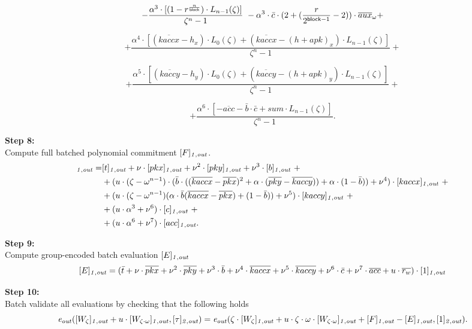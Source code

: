 $$-\frac{\alpha^3 \cdot[(1 - r^{\frac{n}{\mathsf{block}}}) \cdot L_{n-1}(\zeta)]}{\zeta^{n}-1}  \ - \alpha^3 \cdot  \bar{c} \cdot (2+ (\frac{r}{2^{\mathsf{block} -1 }} - 2)) \cdot \overline{aux}_{\omega} + $$

$$+\frac{\alpha^4 \cdot [(\overline{kaccx} - h_x) \cdot L_0(\zeta) + (\overline{kaccx} - (h + apk)_x) \cdot L_{n-1}(\zeta)]}{\zeta^{n} - 1} +$$

$$+\frac{\alpha^5 \cdot[(\overline{kaccy} - h_y) \cdot L_0(\zeta) + (\overline{kaccy} - (h + apk)_y) \cdot L_{n-1}(\zeta)]}{\zeta^{n} - 1} +$$

$$+\frac{\alpha^6 \cdot [- \overline{acc} - \bar{b} \cdot \bar{c} + \mathit{sum} \cdot L_{n-1}(\zeta)]}{\zeta^{n} - 1}.$$

\noindent \textbf{Step 8:} \\
\noindent Compute full batched polynomial commitment $[F]_{\mathit{1,out}}$. 
\begin{align*}
[F]_{\indexoneout} =&  [t]_{\indexoneout} + \nu \cdot [pkx]_{\indexoneout} + \nu^2 \cdot [pky]_{\indexoneout} + \nu^3 \cdot [b]_{\indexoneout} \ + \\
& + (u \cdot (\zeta - \omega^{n-1})\cdot (\bar{b} \cdot ((\overline{kaccx} - \overline{pkx})^2 + \alpha \cdot (\overline{pky} - \overline{kaccy}))+\alpha \cdot (1 - \bar{b})) + \nu^4) \cdot [kaccx]_{\indexoneout} \ + \\  
& +(u \cdot (\zeta - \omega^{n-1})(\alpha \cdot \bar{b}(\overline{kaccx} - \overline{pkx})+ (1- \bar{b})) + \nu^5) \cdot [kaccy]_{\indexoneout} \ + \\  
& +(u\cdot \alpha^3+ \nu^6) \cdot [c]_{\indexoneout} \ + \\  
& +(u\cdot \alpha^6+ \nu^7)\cdot [acc]_{\indexoneout}. \ \\ 
\end{align*}

\noindent \textbf{Step 9:} \\
\noindent Compute group-encoded batch evaluation $[E]_{\mathit{1,out}}$ 
$$[E]_{\mathit{1,out}} = (\bar{t} + \nu \cdot \overline{pkx} + \nu^2 \cdot \overline{pky} + \nu^3 \cdot \bar{b} +
\nu^4 \cdot \overline{kaccx} + \nu^5 \cdot \overline{kaccy} + \nu^6 \cdot \bar{c} + \nu^7 \cdot \overline{acc} + u \cdot  \overline{r_{w}}) \cdot [1]_{\mathit{1,out}}$$

\noindent \textbf{Step 10:} \\
\noindent Batch validate all evaluations by checking that the following holds \\
$$\mathit{e}_{\mathit{out}}([W_{\zeta}]_{\mathit{1,out}} + u \cdot [W_{\zeta \cdot \omega}]_{\mathit{1,out}},[\tau]_{\mathit{2,out}}) = \mathit{e}_{\mathit{out}}(\zeta \cdot [W_{\zeta}]_{\mathit{1,out}} + u \cdot \zeta \cdot \omega \cdot [W_{\zeta \cdot \omega}]_{\mathit{1,out}} + [F]_{\mathit{1,out}} - [E]_{\mathit{1,out}}, [1]_{\mathit{2,out}}).$$